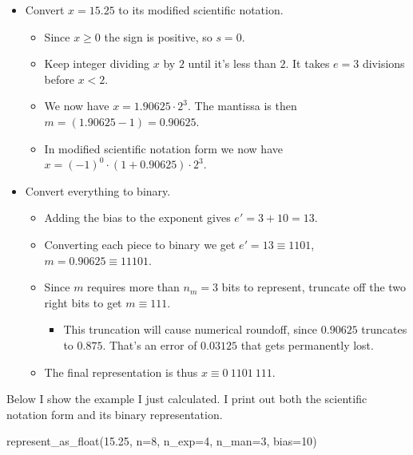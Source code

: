 \documentclass[
  letterpaper,
  DIV=11,
  numbers=noendperiod]{scrreprt}
\newenvironment{Shaded}{\begin{snugshade}}{\end{snugshade}}
\newcommand{\DecValTok}[1]{\textcolor[rgb]{0.68,0.00,0.00}{#1}}
\newcommand{\FloatTok}[1]{\textcolor[rgb]{0.68,0.00,0.00}{#1}}
\newcommand{\NormalTok}[1]{\textcolor[rgb]{0.00,0.23,0.31}{#1}}
\newcommand{\OperatorTok}[1]{\textcolor[rgb]{0.37,0.37,0.37}{#1}}
\providecommand{\tightlist}{%
  \setlength{\itemsep}{0pt}\setlength{\parskip}{0pt}}\usepackage{longtable,booktabs,array}
\begin{document}
\begin{itemize}
\tightlist
\item
  Convert \(x=15.25\) to its modified scientific notation.

  \begin{itemize}
  \tightlist
  \item
    Since \(x \geq 0\) the sign is positive, so \(s=0\).
  \item
    Keep integer dividing \(x\) by \(2\) until it's less than \(2\). It
    takes \(e=3\) divisions before \(x<2\).
  \item
    We now have \(x = 1.90625 \cdot 2^3\). The mantissa is then
    \(m = (1.90625-1) = 0.90625\).
  \item
    In modified scientific notation form we now have
    \(x=(-1)^0 \cdot (1 + 0.90625) \cdot 2^3\).
  \end{itemize}
\item
  Convert everything to binary.

  \begin{itemize}
  \tightlist
  \item
    Adding the bias to the exponent gives \(e'=3+10=13\).
  \item
    Converting each piece to binary we get \(e' = 13 \equiv 1101\),
    \(m = 0.90625 \equiv 11101\).
  \item
    Since \(m\) requires more than \(n_m=3\) bits to represent, truncate
    off the two right bits to get \(m \equiv 111\).

    \begin{itemize}
    \tightlist
    \item
      This truncation will cause numerical roundoff, since \(0.90625\)
      truncates to \(0.875\). That's an error of \(0.03125\) that gets
      permanently lost.
    \end{itemize}
  \item
    The final representation is thus \(x \equiv 0 \ 1101 \ 111\).
  \end{itemize}
\end{itemize}

Below I show the example I just calculated. I print out both the
scientific notation form and its binary representation.

\begin{Shaded}
\begin{Highlighting}[]
\NormalTok{represent\_as\_float(}\FloatTok{15.25}\NormalTok{, n}\OperatorTok{=}\DecValTok{8}\NormalTok{, n\_exp}\OperatorTok{=}\DecValTok{4}\NormalTok{, n\_man}\OperatorTok{=}\DecValTok{3}\NormalTok{, bias}\OperatorTok{=}\DecValTok{10}\NormalTok{)}
\end{Highlighting}
\end{Shaded}
\end{document}

